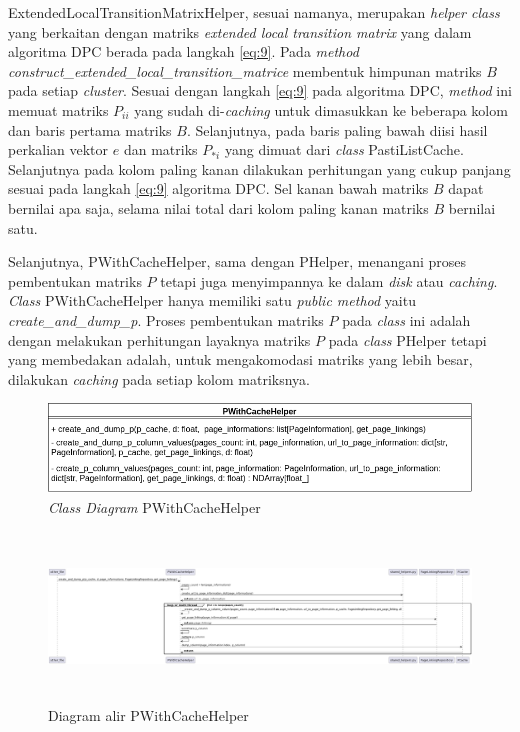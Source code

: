 ExtendedLocalTransitionMatrixHelper, sesuai namanya, merupakan \textit{helper class} yang berkaitan dengan matriks \textit{extended local transition matrix} yang dalam algoritma DPC berada pada langkah \ref{eq:9}. Pada \textit{method} \textit{construct\_extended\_local\_transition\_matrice} membentuk himpunan matriks $B$ pada setiap \textit{cluster}. Sesuai dengan langkah \ref{eq:9} pada algoritma DPC, \textit{method} ini memuat matriks $P_{ii}$ yang sudah di-\textit{caching} untuk dimasukkan ke beberapa kolom dan baris pertama matriks $B$. Selanjutnya, pada baris paling bawah diisi hasil perkalian vektor $e$ dan matriks $P_{*i}$ yang dimuat dari \textit{class} PastiListCache. Selanjutnya pada kolom paling kanan dilakukan perhitungan yang cukup panjang sesuai pada langkah \ref{eq:9} algoritma DPC. Sel kanan bawah matriks $B$ dapat bernilai apa saja, selama nilai total dari kolom paling kanan matriks $B$ bernilai satu.

Selanjutnya, PWithCacheHelper, sama dengan PHelper, menangani proses pembentukan matriks $P$ tetapi juga menyimpannya ke dalam \textit{disk} atau \textit{caching}. \textit{Class} PWithCacheHelper hanya memiliki satu \textit{public method} yaitu \textit{create\_and\_dump\_p}. Proses pembentukan matriks $P$ pada \textit{class} ini adalah dengan melakukan perhitungan layaknya matriks $P$ pada \textit{class} PHelper tetapi yang membedakan adalah, untuk mengakomodasi matriks yang lebih besar, dilakukan \textit{caching} pada setiap kolom matriksnya.

\begin{figure}[H]
  \centering
  \includegraphics[keepaspectratio, width={\textwidth}]{gambar/p_with_cache_helper_class_diagram}
  \caption{\textit{Class Diagram} PWithCacheHelper}
\end{figure}

\begin{figure}[H]
  \centering
  \includegraphics[width={\textwidth}, height={170px}]{gambar/p_with_cache_helper_sequence_diagram}
  \caption{Diagram alir PWithCacheHelper}
\end{figure}

